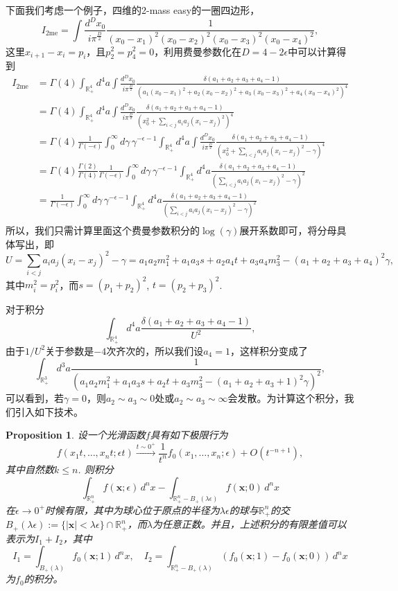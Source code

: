 \documentclass[12pt]{article}
\theoremstyle{definition}
\theoremstyle{plain}
\newtheorem{pro}[para]{Proposition}
\begin{document}
下面我们考虑一个例子，四维的2-mass easy的一圈四边形，
\[
	I_{\text{2me}}=\int \frac{d^{D} x_0}{i \pi^{\frac{D}{2}}} \frac{1}{(x_0-x_1)^2(x_0-x_2)^2(x_0-x_3)^2(x_0-x_4)^2},
\]
这里$x_{i+1}-x_i=p_i$，且$p_2^2=p_4^2=0$，利用费曼参数化在$D=4-2\epsilon$中可以计算得到
\[
\begin{aligned}
	I_{\text{2me}}&=\Gamma(4)\int_{\mathbb R_+^4}d^4a\int \frac{d^{D} x_0}{i \pi^{\frac{D}{2}}} \frac{\delta(a_1+a_2+a_3+a_4-1)}{(a_1(x_0-x_1)^2+a_2(x_0-x_2)^2+a_3(x_0-x_3)^2+a_4(x_0-x_4)^2)^4}\\
	&=\Gamma(4)\int_{\mathbb R_+^4}d^4a\int \frac{d^{D} x_0}{i \pi^{\frac{D}{2}}} \frac{\delta(a_1+a_2+a_3+a_4-1)}{(x_0^2+\sum_{i<j}a_i a_j (x_i-x_j)^2)^4}\\
	&=\Gamma(4)\frac{1}{\Gamma(-\epsilon)}\int_0^\infty d\gamma \, \gamma^{-\epsilon-1}\int_{\mathbb R_+^4}d^4a\int \frac{d^{D} x_0}{i \pi^{\frac{D}{2}}} \frac{\delta(a_1+a_2+a_3+a_4-1)}{(x_0^2+\sum_{i<j}a_i a_j (x_i-x_j)^2-\gamma)^4}\\
	&=\Gamma(4)\frac{\Gamma(2)}{\Gamma(4)}\frac{1}{\Gamma(-\epsilon)}\int_0^\infty d\gamma \, \gamma^{-\epsilon-1}\int_{\mathbb R_+^4}d^4a\frac{\delta(a_1+a_2+a_3+a_4-1)}{(\sum_{i<j}a_i a_j (x_i-x_j)^2-\gamma)^2}\\
	&=\frac{1}{\Gamma(-\epsilon)}\int_0^\infty d\gamma \, \gamma^{-\epsilon-1}\int_{\mathbb R_+^4}d^4a\frac{\delta(a_1+a_2+a_3+a_4-1)}{(\sum_{i<j}a_i a_j (x_i-x_j)^2-\gamma)^2}\\
\end{aligned}
\]
所以，我们只需计算里面这个费曼参数积分的$\log(\gamma)$展开系数即可，将分母具体写出，即
\[
	U=\sum_{i<j}a_i a_j (x_i-x_j)^2-\gamma=a_1a_2 m_1^2+a_1a_3s+a_2a_4t+a_3a_4m_3^2-(a_1+a_2+a_3+a_4)^2\gamma,
\]
其中$m_i^2=p_i^2$，而$s=(p_1+p_2)^2$, $t=(p_2+p_3)^2$.

对于积分 
\[
	\int_{\mathbb R_+^4}d^4a\frac{\delta(a_1+a_2+a_3+a_4-1)}{U^2},
\]
由于$1/U^2$关于参数是$-4$次齐次的，所以我们设$a_4=1$，这样积分变成了
\[
	\int_{\mathbb R_+^3}d^3a\frac{1}{(a_1a_2 m_1^2+a_1a_3s+a_2t+a_3m_3^2-(a_1+a_2+a_3+1)^2\gamma)^2},
\]
可以看到，若$\gamma=0$，则$a_2\sim a_3\sim 0$处或$a_2\sim a_3\sim \infty$会发散。为计算这个积分，我们引入如下技术。



\begin{pro}
设一个光滑函数$f$具有如下极限行为
\[
f(x_1t,\dots,x_nt;\epsilon t)\xrightarrow{t\sim 0^+}\frac{1}{t^n}f_0(x_1,\dots,x_n;\epsilon)+O(t^{-n+1}),
\]
其中自然数$k\leq n$. 则积分
\[
\int_{\mathbb R_+^n} f(\mathbf{x};\epsilon)\,d^nx-\int_{\mathbb R_+^n - B_+(\lambda \epsilon)} f(\mathbf{x};0)\,d^nx
\]
在$\epsilon\to 0^+$时候有限，其中为球心位于原点的半径为$\lambda \epsilon$的球与$\mathbb R_+^n$的交$B_+(\lambda \epsilon):=\{|\mathbf x|<\lambda \epsilon\}\cap \mathbb R_+^n$，而$\lambda$为任意正数。并且，上述积分的有限差值可以表示为$I_1+I_2$，其中
\[
	I_1=\int_{B_+(\lambda)}f_0(\mathbf{x};1)\,d^nx,\quad I_2=\int_{\mathbb R_+^n - B_+(\lambda)} (f_0(\mathbf x;1)-f_0(\mathbf x;0))\,d^nx
\]
为$f_0$的积分。
\end{pro}
\end{document}
